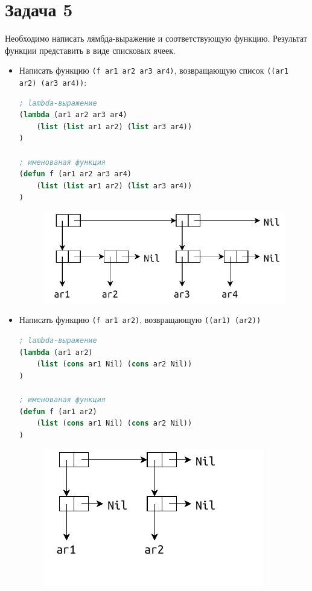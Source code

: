 \section{Задача 5}

Необходимо написать лямбда-выражение и соответствующую функцию. Результат функции представить в виде списковых ячеек.

\begin{itemize}
	\item Написать функцию \texttt{(f ar1 ar2 ar3 ar4)}, возвращающую список \texttt{((ar1 ar2) (ar3 ar4))}:
	
\begin{lstlisting}[language=Lisp]
; lambda-выражение
(lambda (ar1 ar2 ar3 ar4)
	(list (list ar1 ar2) (list ar3 ar4))
)

; именованая функция
(defun f (ar1 ar2 ar3 ar4)
	(list (list ar1 ar2) (list ar3 ar4))
)
\end{lstlisting}

	\begin{figure}[ht]
		\centering
		\includegraphics[scale=1]{img/1-7}
	\end{figure}

	\clearpage

	\item Написать функцию \texttt{(f ar1 ar2)}, возвращающую \texttt{((ar1) (ar2))}
	
\begin{lstlisting}[language=Lisp]
; lambda-выражение
(lambda (ar1 ar2)
	(list (cons ar1 Nil) (cons ar2 Nil))
)

; именованая функция
(defun f (ar1 ar2)
	(list (cons ar1 Nil) (cons ar2 Nil))
)
\end{lstlisting}

	\begin{figure}[ht]
		\centering
		\includegraphics[scale=1.2]{img/1-8}
	\end{figure}
		

\end{itemize}

